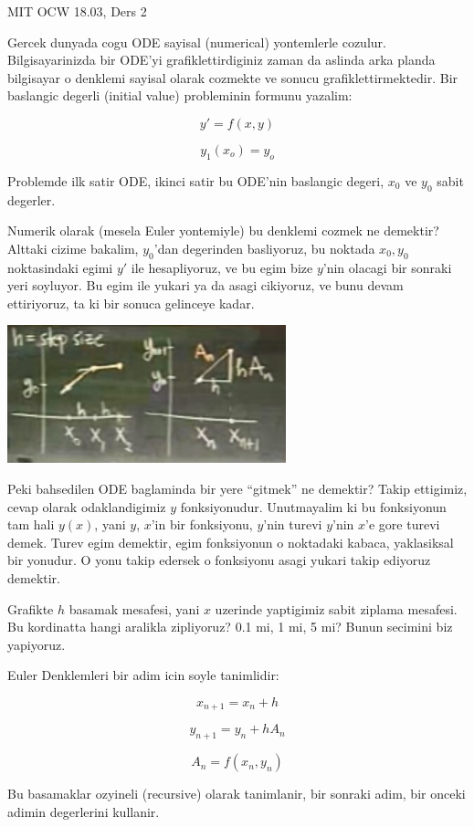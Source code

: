 \documentclass[12pt,fleqn]{article}
\begin{document}
MIT OCW 18.03, Ders 2

Gercek dunyada cogu ODE sayisal (numerical) yontemlerle
cozulur. Bilgisayarinizda bir ODE'yi grafiklettirdiginiz zaman da aslinda arka
planda bilgisayar o denklemi sayisal olarak cozmekte ve sonucu
grafiklettirmektedir. Bir baslangic degerli (initial value) probleminin formunu
yazalim: 

\[ y' = f(x,y) \]

\[ y_1(x_o) = y_o \]

Problemde ilk satir ODE, ikinci satir bu ODE'nin baslangic degeri, $x_0$ ve $y_0$
sabit degerler. 

Numerik olarak (mesela Euler yontemiyle) bu denklemi cozmek ne demektir? Alttaki
cizime bakalim, $y_0$'dan degerinden basliyoruz, bu noktada $x_0,y_0$
noktasindaki egimi $y'$ ile hesapliyoruz, ve bu egim bize $y$'nin olacagi bir
sonraki yeri soyluyor. Bu egim ile yukari ya da asagi cikiyoruz, ve bunu devam
ettiriyoruz, ta ki bir sonuca gelinceye kadar.

\includegraphics[height=4cm]{2_1.png}

Peki bahsedilen ODE baglaminda bir yere ``gitmek'' ne demektir? Takip ettigimiz,
cevap olarak odaklandigimiz $y$ fonksiyonudur. Unutmayalim ki bu fonksiyonun tam
hali $y(x)$, yani $y$, $x$'in bir fonksiyonu, $y$'nin turevi $y$'nin $x$'e gore
turevi demek. Turev egim demektir, egim fonksiyonun o noktadaki kabaca,
yaklasiksal bir yonudur. O yonu takip edersek o fonksiyonu asagi yukari takip
ediyoruz demektir.

Grafikte $h$ basamak mesafesi, yani $x$ uzerinde yaptigimiz sabit ziplama
mesafesi. Bu kordinatta hangi aralikla zipliyoruz? 0.1 mi, 1 mi, 5 mi? Bunun
secimini biz yapiyoruz. 

Euler Denklemleri bir adim icin soyle tanimlidir:

\[ x_{n+1} = x_n + h \]

\[ y_{n+1} = y_n + hA_n \]

\[ A_n = f(x_n, y_n) \]

Bu basamaklar ozyineli (recursive) olarak tanimlanir, bir sonraki adim, bir
onceki adimin degerlerini kullanir. 
\end{document}
